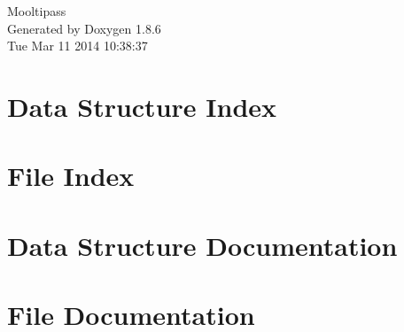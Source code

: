 \documentclass[twoside]{book}
\newcommand{\clearemptydoublepage}{%
  \newpage{\pagestyle{empty}\cleardoublepage}%
}
\begin{document}
\hypersetup{pageanchor=false}
\begin{titlepage}
\vspace*{7cm}
\begin{center}%
{\Large Mooltipass }\\
\vspace*{1cm}
{\large Generated by Doxygen 1.8.6}\\
\vspace*{0.5cm}
{\small Tue Mar 11 2014 10:38:37}\\
\end{center}
\end{titlepage}
\clearemptydoublepage
\tableofcontents
\clearemptydoublepage
{}
\hypersetup{pageanchor=true}

\chapter{Data Structure Index}

\chapter{File Index}

\chapter{Data Structure Documentation}









\chapter{File Documentation}




























\newpage
{}
{}
\printindex
\end{document}

